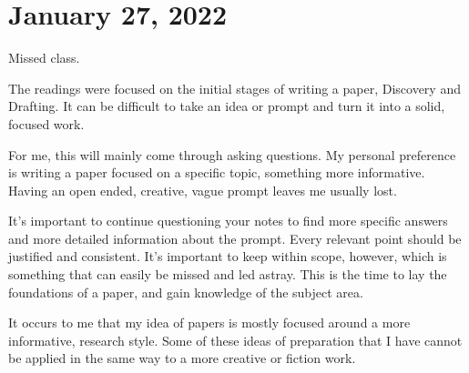 \documentclass[journal.tex]{subfiles}
\begin{document}
\pagebreak
\section*{January 27, 2022}

Missed class.

The readings were focused on the initial stages of writing a paper, Discovery and Drafting.
It can be difficult to take an idea or prompt and turn it into a solid, focused work.

For me, this will mainly come through asking questions.
My personal preference is writing a paper focused on a specific topic, something more informative.
Having an open ended, creative, vague prompt leaves me usually lost.

It's important to continue questioning your notes to find more specific answers and more detailed information about the prompt.
Every relevant point should be justified and consistent.
It's important to keep within scope, however, which is something that can easily be missed and led astray.
This is the time to lay the foundations of a paper, and gain knowledge of the subject area.

It occurs to me that my idea of papers is mostly focused around a more informative, research style.
Some of these ideas of preparation that I have cannot be applied in the same way to a more creative or fiction work.
\end{document}
